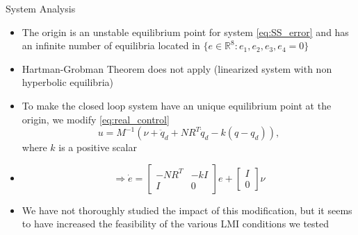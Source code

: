 \begin{frame}{System Analysis}

\begin{itemize}
    \item The origin is an unstable equilibrium point for system \eqref{eq:SS_error} and has an infinite number of equilibria located in $\{ e \in \mathbb{R}^8 :  e_1, e_2, e_3, e_4 = 0 \}$
    \item Hartman-Grobman Theorem does not apply (linearized system with non hyperbolic equilibria)
    \item To make the closed loop system have an unique equilibrium point at the origin, we modify \eqref{eq:real_control} 
\begin{equation}
    u = M^{-1} \left( \nu + \ddot{q}_d + NR^T\dot{q}_d -k(q-q_d) \right),
\end{equation} \label{eq:real_cont_new}
where $k$ is a positive scalar
\item \begin{equation}
    \Rightarrow \dot{e} = \begin{bmatrix}
-NR^T & -kI\\
I & 0
\end{bmatrix}e + \begin{bmatrix}
I\\
0
\end{bmatrix} \nu \label{eq:newclosedloop}
\end{equation}
\item We have not thoroughly studied the impact of this modification, but it seems to have increased the feasibility of the various LMI conditions we tested 
\end{itemize}
    
\end{frame}


